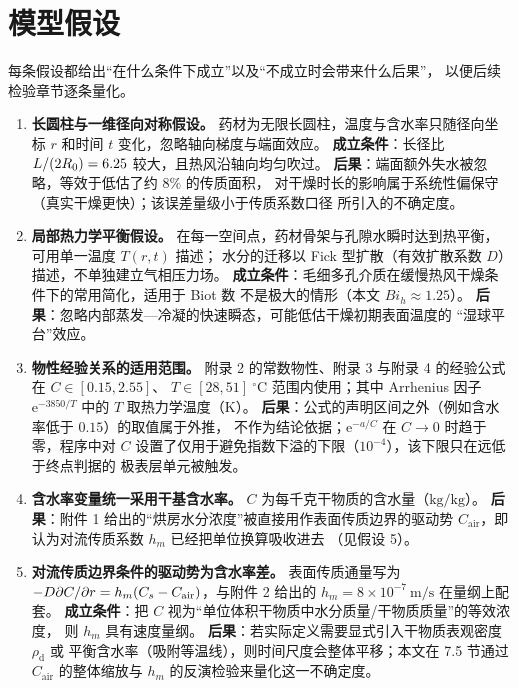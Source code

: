 \section{模型假设}

每条假设都给出“在什么条件下成立”以及“不成立时会带来什么后果”，
以便后续检验章节逐条量化。

\begin{enumerate}[leftmargin=2.4em,itemsep=0.35em]

\item \textbf{长圆柱与一维径向对称假设。}
药材为无限长圆柱，温度与含水率只随径向坐标 $r$ 和时间 $t$ 变化，忽略轴向梯度与端面效应。
\textbf{成立条件}：长径比 $L/(2R_{0})=6.25$ 较大，且热风沿轴向均匀吹过。
\textbf{后果}：端面额外失水被忽略，等效于低估了约 $8\%$ 的传质面积，
对干燥时长的影响属于系统性偏保守（真实干燥更快）；该误差量级小于传质系数口径
所引入的不确定度。

\item \textbf{局部热力学平衡假设。}
在每一空间点，药材骨架与孔隙水瞬时达到热平衡，可用单一温度 $T(r,t)$ 描述；
水分的迁移以 Fick 型扩散（有效扩散系数 $D$）描述，不单独建立气相压力场。
\textbf{成立条件}：毛细多孔介质在缓慢热风干燥条件下的常用简化，适用于 Biot 数
不是极大的情形（本文 $Bi_h\approx1.25$）。
\textbf{后果}：忽略内部蒸发—冷凝的快速瞬态，可能低估干燥初期表面温度的
“湿球平台”效应。

\item \textbf{物性经验关系的适用范围。}
附录 2 的常数物性、附录 3 与附录 4 的经验公式在 $C\in[0.15,2.55]$、
$T\in[28,51]\ ^\circ\mathrm{C}$ 范围内使用；其中 Arrhenius 因子
$\mathrm{e}^{-3850/T}$ 中的 $T$ 取热力学温度（K）。
\textbf{后果}：公式的声明区间之外（例如含水率低于 $0.15$）的取值属于外推，
不作为结论依据；$\mathrm{e}^{-a/C}$ 在 $C\to0$ 时趋于零，程序中对
$C$ 设置了仅用于避免指数下溢的下限（$10^{-4}$），该下限只在远低于终点判据的
极表层单元被触发。

\item \textbf{含水率变量统一采用干基含水率。}
$C$ 为每千克干物质的含水量（$\mathrm{kg/kg}$）。
\textbf{后果}：附件 1 给出的“烘房水分浓度”被直接用作表面传质边界的驱动势
$C_{\mathrm{air}}$，即认为对流传质系数 $h_m$ 已经把单位换算吸收进去
（见假设 5）。

\item \textbf{对流传质边界条件的驱动势为含水率差。}
表面传质通量写为 $-D\partial C/\partial r=h_m(C_{s}-C_{\mathrm{air}})$，与附件 2 给出的
$h_m=8\times10^{-7}\ \mathrm{m/s}$ 在量纲上配套。
\textbf{成立条件}：把 $C$ 视为“单位体积干物质中水分质量/干物质质量”的等效浓度，
则 $h_m$ 具有速度量纲。
\textbf{后果}：若实际定义需要显式引入干物质表观密度 $\rho_{\mathrm{d}}$ 或
平衡含水率（吸附等温线），则时间尺度会整体平移；本文在 7.5 节通过
$C_{\mathrm{air}}$ 的整体缩放与 $h_m$ 的反演检验来量化这一不确定度。


\end{enumerate}
